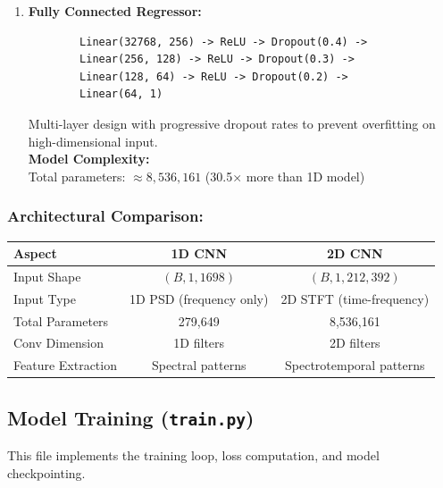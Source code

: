 \begin{enumerate}
    The \verb|AdaptiveAvgPool2d((16, 16))| layer ensures that regardless of input dimensions, 
    the output is always $128 \times 16 \times 16 = 32,768$ features. \\

    \item \textbf{Fully Connected Regressor:}
    \begin{verbatim}
        Linear(32768, 256) -> ReLU -> Dropout(0.4) ->
        Linear(256, 128) -> ReLU -> Dropout(0.3) ->
        Linear(128, 64) -> ReLU -> Dropout(0.2) ->
        Linear(64, 1)
    \end{verbatim}

    Multi-layer design with progressive dropout rates to prevent overfitting on high-dimensional input. \\
    \textbf{Model Complexity:} \\
    Total parameters: $\approx 8,536,161$ (30.5× more than 1D model)
\end{enumerate}

\subsubsection{Architectural Comparison:}

\begin{center}
    \begin{tabular}{|l|c|c|}
    \hline
    \textbf{Aspect} & \textbf{1D CNN} & \textbf{2D CNN} \\
    \hline
        Input Shape & $(B, 1, 1698)$ & $(B, 1, 212, 392)$ \\
        Input Type & 1D PSD (frequency only) & 2D STFT (time-frequency) \\
        Total Parameters & 279,649 & 8,536,161 \\
        Conv Dimension & 1D filters & 2D filters \\
        Feature Extraction & Spectral patterns & Spectrotemporal patterns \\
    \hline
    \end{tabular}
\end{center}

\subsection{Model Training (\texttt{train.py})}

This file implements the training loop, loss computation, and model checkpointing.

